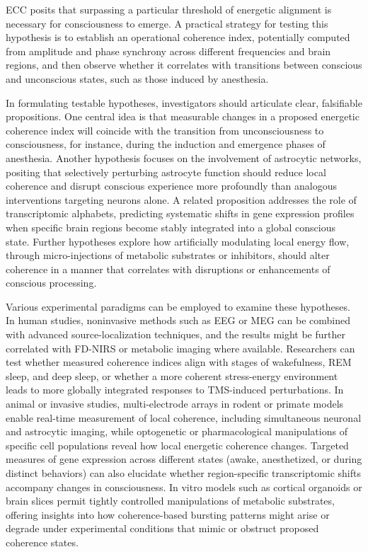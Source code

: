 \begin{refsection}
ECC posits that surpassing a particular threshold of energetic alignment is necessary for consciousness to emerge. A practical strategy for testing this hypothesis is to establish an operational coherence index, potentially computed from amplitude and phase synchrony across different frequencies and brain regions, and then observe whether it correlates with transitions between conscious and unconscious states, such as those induced by anesthesia.

In formulating testable hypotheses, investigators should articulate clear, falsifiable propositions. One central idea is that measurable changes in a proposed energetic coherence index will coincide with the transition from unconsciousness to consciousness, for instance, during the induction and emergence phases of anesthesia. Another hypothesis focuses on the involvement of astrocytic networks, positing that selectively perturbing astrocyte function should reduce local coherence and disrupt conscious experience more profoundly than analogous interventions targeting neurons alone. A related proposition addresses the role of transcriptomic alphabets, predicting systematic shifts in gene expression profiles when specific brain regions become stably integrated into a global conscious state. Further hypotheses explore how artificially modulating local energy flow, through micro-injections of metabolic substrates or inhibitors, should alter coherence in a manner that correlates with disruptions or enhancements of conscious processing.

Various experimental paradigms can be employed to examine these hypotheses. In human studies, noninvasive methods such as EEG or MEG can be combined with advanced source-localization techniques, and the results might be further correlated with FD-NIRS or metabolic imaging where available. Researchers can test whether measured coherence indices align with stages of wakefulness, REM sleep, and deep sleep, or whether a more coherent stress-energy environment leads to more globally integrated responses to TMS-induced perturbations. In animal or invasive studies, multi-electrode arrays in rodent or primate models enable real-time measurement of local coherence, including simultaneous neuronal and astrocytic imaging, while optogenetic or pharmacological manipulations of specific cell populations reveal how local energetic coherence changes. Targeted measures of gene expression across different states (awake, anesthetized, or during distinct behaviors) can also elucidate whether region-specific transcriptomic shifts accompany changes in consciousness. In vitro models such as cortical organoids or brain slices permit tightly controlled manipulations of metabolic substrates, offering insights into how coherence-based bursting patterns might arise or degrade under experimental conditions that mimic or obstruct proposed coherence states.


\end{refsection}
